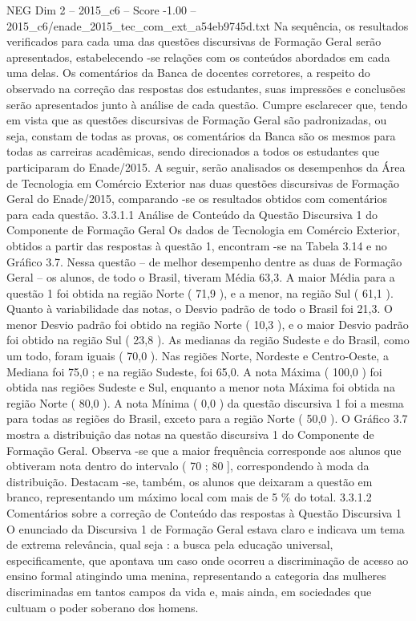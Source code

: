 \begin{textsample}{NEG Dim 2 – 2015\_c6 – Score -1.00 – 2015\_c6/enade\_2015\_tec\_com\_ext\_a54eb9745d.txt}
Na sequência, os resultados verificados para cada uma das questões discursivas de Formação Geral serão apresentados, estabelecendo -se relações com os conteúdos abordados em cada uma delas.
Os comentários da Banca de docentes corretores, a respeito do observado na correção das respostas dos estudantes, suas impressões e conclusões serão apresentados junto à análise de cada questão.
Cumpre esclarecer que, tendo em vista que as questões discursivas de Formação Geral são padronizadas, ou seja, constam de todas as provas, os comentários da Banca são os mesmos para todas as carreiras acadêmicas, sendo direcionados a todos os estudantes que participaram do Enade/2015.
A seguir, serão analisados os desempenhos da Área de Tecnologia em Comércio Exterior nas duas questões discursivas de Formação Geral do Enade/2015, comparando -se os resultados obtidos com comentários para cada questão. 3.3.1.1 Análise de Conteúdo da Questão Discursiva 1 do Componente de Formação Geral Os dados de Tecnologia em Comércio Exterior, obtidos a partir das respostas à questão 1, encontram -se na Tabela 3.14 e no Gráfico 3.7.
Nessa questão – de melhor desempenho dentre as duas de Formação Geral – os alunos, de todo o Brasil, tiveram Média 63,3.
A maior Média para a questão 1 foi obtida na região Norte ( 71,9 ), e a menor, na região Sul ( 61,1 ).
Quanto à variabilidade das notas, o Desvio padrão de todo o Brasil foi 21,3.
O menor Desvio padrão foi obtido na região Norte ( 10,3 ), e o maior Desvio padrão foi obtido na região Sul ( 23,8 ).
As medianas da região Sudeste e do Brasil, como um todo, foram iguais ( 70,0 ).
Nas regiões Norte, Nordeste e Centro-Oeste, a Mediana foi 75,0 ; e na região Sudeste, foi 65,0.
A nota Máxima ( 100,0 ) foi obtida nas regiões Sudeste e Sul, enquanto a menor nota Máxima foi obtida na região Norte ( 80,0 ).
A nota Mínima ( 0,0 ) da questão discursiva 1 foi a mesma para todas as regiões do Brasil, exceto para a região Norte ( 50,0 ).
O Gráfico 3.7 mostra a distribuição das notas na questão discursiva 1 do Componente de Formação Geral.
Observa -se que a maior frequência corresponde aos alunos que obtiveram nota dentro do intervalo ( 70 ; 80 ], correspondendo à moda da distribuição.
Destacam -se, também, os alunos que deixaram a questão em branco, representando um máximo local com mais de 5 \% do total. 3.3.1.2 Comentários sobre a correção de Conteúdo das respostas à Questão Discursiva 1 O enunciado da Discursiva 1 de Formação Geral estava claro e indicava um tema de extrema relevância, qual seja : a busca pela educação universal, especificamente, que apontava um caso onde ocorreu a discriminação de acesso ao ensino formal atingindo uma menina, representando a categoria das mulheres discriminadas em tantos campos da vida e, mais ainda, em sociedades que cultuam o poder soberano dos homens.

\end{textsample}
